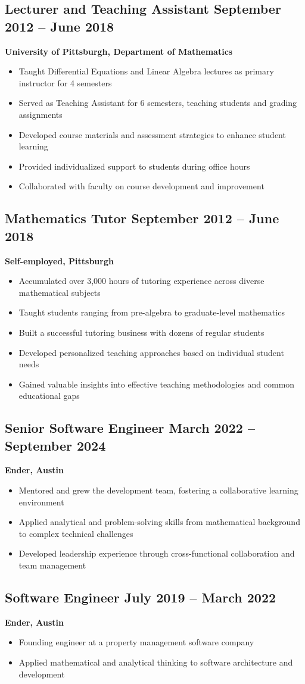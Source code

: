 \documentclass[11pt]{article}
\newcommand{\cventry}[3]{
  \subsection[#1]{#1 \hfill #2}
  #3
}
\begin{document}
\cventry{Lecturer and Teaching Assistant}{September 2012 -- June 2018}{
  \textbf{University of Pittsburgh, Department of Mathematics}
  \begin{itemize}[leftmargin=*]
    \item Taught Differential Equations and Linear Algebra lectures as primary instructor for 4 semesters
    \item Served as Teaching Assistant for 6 semesters, teaching students and grading assignments
    \item Developed course materials and assessment strategies to enhance student learning
    \item Provided individualized support to students during office hours
    \item Collaborated with faculty on course development and improvement
  \end{itemize}
}

\cventry{Mathematics Tutor}{September 2012 -- June 2018}{
  \textbf{Self-employed, Pittsburgh}
  \begin{itemize}[leftmargin=*]
    \item Accumulated over 3,000 hours of tutoring experience across diverse mathematical subjects
    \item Taught students ranging from pre-algebra to graduate-level mathematics
    \item Built a successful tutoring business with dozens of regular students
    \item Developed personalized teaching approaches based on individual student needs
    \item Gained valuable insights into effective teaching methodologies and common educational gaps
  \end{itemize}
}

\cventry{Senior Software Engineer}{March 2022 -- September 2024}{
  \textbf{Ender, Austin}
  \begin{itemize}[leftmargin=*]
    \item Mentored and grew the development team, fostering a collaborative learning environment
    \item Applied analytical and problem-solving skills from mathematical background to complex technical challenges
    \item Developed leadership experience through cross-functional collaboration and team management
  \end{itemize}
}

\cventry{Software Engineer}{July 2019 -- March 2022}{
  \textbf{Ender, Austin}
  \begin{itemize}[leftmargin=*]
    \item Founding engineer at a property management software company
    \item Applied mathematical and analytical thinking to software architecture and development
  \end{itemize}
}
\end{document}
